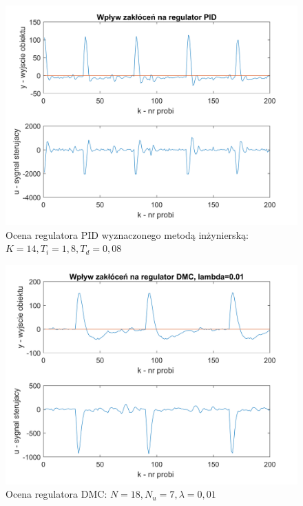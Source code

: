 \documentclass[a4paper, 10pt]{article}
\begin{document}
\begin{figure}[H]
	\centering
	\includegraphics[width=0.9\linewidth]{pidzaklocenia}
	\caption{Ocena regulatora PID wyznaczonego metodą inżynierską: $K=14, T_{i}=1,8, T_{d}=0,08$}
	\label{fig:pidzaklocenia}
\end{figure}

\begin{figure}[H]
	\centering
	\includegraphics[width=0.9\linewidth]{dmc001zakl}
	\caption{Ocena regulatora DMC: $N=18, N_{u}=7, \lambda=0,01$}
	\label{fig:dmc001zakl}
\end{figure}
\end{document}
